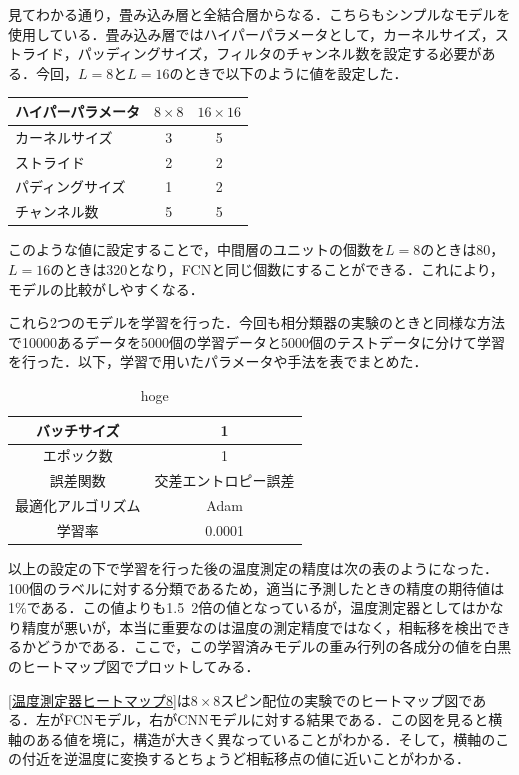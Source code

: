\documentclass[a4paper,11pt]{jsreport}
\begin{document}
見てわかる通り，畳み込み層と全結合層からなる．こちらもシンプルなモデルを使用している．畳み込み層ではハイパーパラメータとして，カーネルサイズ，ストライド，パッディングサイズ，フィルタのチャンネル数を設定する必要がある．今回，$L=8$と$L=16$のときで以下のように値を設定した．
\begin{center}
  \begin{tabular}{|l|c|c|} \hline
    ハイパーパラメータ& $8 \times 8$ & $16 \times 16$ \\ \hline
    カーネルサイズ & 3 & 5 \\
    ストライド & 2 & 2 \\ 
    パディングサイズ & 1 & 2 \\ 
    チャンネル数 & 5 & 5 \\ \hline 
  \end{tabular}
\end{center}
このような値に設定することで，中間層のユニットの個数を$L=8$のときは80，$L=16$のときは320となり，FCNと同じ個数にすることができる．これにより，モデルの比較がしやすくなる．\par
これら2つのモデルを学習を行った．今回も相分類器の実験のときと同様な方法で10000あるデータを5000個の学習データと5000個のテストデータに分けて学習を行った．以下，学習で用いたパラメータや手法を表でまとめた．
\begin{table}[H]
  \centering
  \begin{tabular}{cc} \hline
    バッチサイズ & 1 \rule[0pt]{0pt}{1pt} \\ \hline
    エポック数 & 1 \rule[0pt]{0pt}{1pt} \\ \hline
    誤差関数 & 交差エントロピー誤差 \rule[0pt]{0pt}{1pt} \\\hline
    最適化アルゴリズム & Adam \rule[0pt]{0pt}{1pt} \\\hline
    学習率 & 0.0001 \rule[0pt]{0pt}{1pt} \\\hline
  \end{tabular}
  \caption{hoge}
  \label{学習で用いたもの2}
\end{table}
以上の設定の下で学習を行った後の温度測定の精度は次の表のようになった．
100個のラベルに対する分類であるため，適当に予測したときの精度の期待値は1\%である．この値よりも1.5~2倍の値となっているが，温度測定器としてはかなり精度が悪いが，本当に重要なのは温度の測定精度ではなく，相転移を検出できるかどうかである．ここで，この学習済みモデルの重み行列の各成分の値を白黒のヒートマップ図でプロットしてみる．\par
\ref{温度測定器ヒートマップ8}は$8 \times 8$スピン配位の実験でのヒートマップ図である．左がFCNモデル，右がCNNモデルに対する結果である．この図を見ると横軸のある値を境に，構造が大きく異なっていることがわかる．そして，横軸のこの付近を逆温度に変換するとちょうど相転移点の値に近いことがわかる．\par
\end{document}
